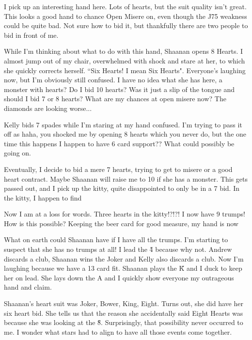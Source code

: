 \documentclass[a4paper]{JoshCards}
\begin{document}
I pick up an interesting hand here. Lots of hearts, but the suit quality isn't great. This looks a good hand to chance Open Misere on, even though the \D J75 weakness could be quite bad. Not sure how to bid it, but thankfully there are two people to bid in front of me.

While I'm thinking about what to do with this hand, Shaanan opens 8 Hearts. I almost jump out of my chair, overwhelmed with shock and stare at her, to which she quickly corrects herself. ``Six Hearts! I mean Six Hearts". Everyone's laughing now, but I'm obviously still confused. I have no idea what she has here, a monster with hearts? Do I bid 10 hearts? Was it just a slip of the tongue and should I bid 7 or 8 hearts? What are my chances at open misere now? The diamonds are looking worse... 

Kelly bids 7 spades while I'm staring at my hand confused. I'm trying to pass it off as haha, you shocked me by opening 8 hearts which you never do, but the one time this happens I happen to have 6 card support?? What could possibly be going on.

Eventually, I decide to bid a mere 7 hearts, trying to get to misere or a good heart contract. Maybe Shaanan will raise me to 10 if she has a monster. This gets passed out, and I pick up the kitty, quite disappointed to only be in a 7 bid. In the kitty, I happen to find

\begin{center}
\end{center}

Now I am at a loss for words. Three hearts in the kitty!?!?! I now have 9 trumps! How is this possible? Keeping the beer card for good measure, my hand is now

\gamefont{\larger}
\northhand{}{}{}{}
\westhand{}{}{}{}
\easthand{}{}{}{}
\leftupper{}%
{}{}
\leftupper{}{}{}
\rightupper{}{}{}
\rightlower{}{}{}
\showAll*

What on earth could Shaanan have if I have all the trumps. I'm starting to suspect that she has no trumps at all! I lead the \H 4 because why not. Andrew discards a club, Shaanan wins the Joker and Kelly also discards a club. Now I'm laughing because we have a 13 card fit. Shaanan plays the \H K and I duck to keep her on lead. She lays down the \D A and I quickly show everyone my outrageous hand and claim.

Shaanan's heart suit was Joker, Bower, King, Eight. Turns out, she did have her six heart bid. She tells us that the reason she accidentally said Eight Hearts was because she was looking at the \H 8. Surprisingly, that possibility never occurred to me. I wonder what stars had to align to have all those events come together.
\end{document}
